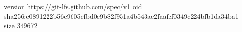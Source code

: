version https://git-lfs.github.com/spec/v1
oid sha256:c0891222b56c9605cfbd0c9b82f951a4b543ac2faafcf0349c224bfb1da34ba1
size 349672
